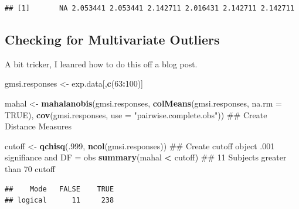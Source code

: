 \documentclass[]{book}
\newenvironment{Shaded}{\begin{snugshade}}{\end{snugshade}}
\newcommand{\KeywordTok}[1]{\textcolor[rgb]{0.13,0.29,0.53}{\textbf{#1}}}
\newcommand{\DataTypeTok}[1]{\textcolor[rgb]{0.13,0.29,0.53}{#1}}
\newcommand{\DecValTok}[1]{\textcolor[rgb]{0.00,0.00,0.81}{#1}}
\newcommand{\StringTok}[1]{\textcolor[rgb]{0.31,0.60,0.02}{#1}}
\newcommand{\CommentTok}[1]{\textcolor[rgb]{0.56,0.35,0.01}{\textit{#1}}}
\newcommand{\OtherTok}[1]{\textcolor[rgb]{0.56,0.35,0.01}{#1}}
\newcommand{\OperatorTok}[1]{\textcolor[rgb]{0.81,0.36,0.00}{\textbf{#1}}}
\newcommand{\NormalTok}[1]{#1}
\theoremstyle{definition}
\theoremstyle{definition}
\theoremstyle{definition}
\theoremstyle{remark}
\begin{document}
\begin{verbatim}
## [1]       NA 2.053441 2.053441 2.142711 2.016431 2.142711 2.142711
\end{verbatim}

\subsection{Checking for Multivariate
Outliers}\label{checking-for-multivariate-outliers}

A bit tricker, I leanred how to do this off a blog post.

\begin{Shaded}
\begin{Highlighting}[]
\NormalTok{gmsi.responses <-}\StringTok{ }\NormalTok{exp.data[,}\KeywordTok{c}\NormalTok{(}\DecValTok{63}\OperatorTok{:}\DecValTok{100}\NormalTok{)]}

\NormalTok{mahal <-}\StringTok{ }\KeywordTok{mahalanobis}\NormalTok{(gmsi.responses,}
                     \KeywordTok{colMeans}\NormalTok{(gmsi.responses, }\DataTypeTok{na.rm =} \OtherTok{TRUE}\NormalTok{), }
                     \KeywordTok{cov}\NormalTok{(gmsi.responses, }
                         \DataTypeTok{use =} \StringTok{"pairwise.complete.obs"}\NormalTok{))                    ## Create Distance Measures}

\NormalTok{cutoff <-}\StringTok{ }\KeywordTok{qchisq}\NormalTok{(.}\DecValTok{999}\NormalTok{, }\KeywordTok{ncol}\NormalTok{(gmsi.responses))                                ## Create cutoff object .001 signifiance and DF = obs}
\KeywordTok{summary}\NormalTok{(mahal }\OperatorTok{<}\StringTok{ }\NormalTok{cutoff)                                                     ## 11 Subjects greater than 70 cutoff }
\end{Highlighting}
\end{Shaded}

\begin{verbatim}
##    Mode   FALSE    TRUE 
## logical      11     238
\end{verbatim}

\begin{Shaded}
\end{Shaded}
\end{document}
